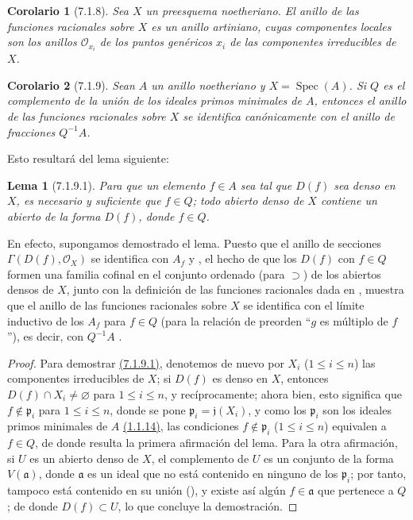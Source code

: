 \documentclass[oneside]{amsart}
\theoremstyle{ega-env-style}
\theoremstyle{ega-thm-env-style}
\newtheorem*{lemma}{Lema}
\newtheorem*{corollary}{Corolario}
\theoremstyle{ega-defn-env-style}
\def\leq{\leqslant}                 %
\let\EGAOriginalLabel\label
\renewcommand{\label}[1]{\phantomsection\EGAOriginalLabel{#1}}
\begin{document}
\begin{corollary}[7.1.8]
\label{I.7.1.8}
Sea $X$ un preesquema noetheriano.
El anillo de las funciones racionales sobre $X$ es un anillo artiniano, cuyas componentes locales son los anillos $\mathscr{O}_{x_i}$ de los puntos genéricos $x_i$ de las componentes irreducibles de $X$.
\end{corollary}

\begin{corollary}[7.1.9]
\label{I.7.1.9}
Sean $A$ un anillo noetheriano y $X=\operatorname{Spec}(A)$.
Si $Q$ es el complemento de la unión de los ideales primos minimales de $A$, entonces el anillo de las funciones racionales sobre $X$ se identifica canónicamente con el anillo de fracciones $Q^{-1}A$.
\end{corollary}

Esto resultará del lema siguiente:
\begin{lemma}[7.1.9.1]
\label{I.7.1.9.1}
Para que un elemento $f\in A$ sea tal que $D(f)$ sea denso en $X$, es necesario y suficiente que $f\in Q$; todo abierto denso de $X$ contiene un abierto de la forma $D(f)$, donde $f\in Q$.
\end{lemma}

En efecto, supongamos demostrado el lema. Puesto que el anillo de secciones $\Gamma(D(f),\mathscr{O}_X)$ se identifica con $A_f$  y , el hecho de que los $D(f)$ con $f\in Q$ formen una familia cofinal en el conjunto ordenado (para $\supset$) de los abiertos densos de $X$, junto con la definición de las funciones racionales dada en , muestra que el anillo de las funciones racionales sobre $X$ se identifica con el límite inductivo de los $A_f$ para $f\in Q$ (para la relación de preorden ``$g$ es múltiplo de $f$''), es decir, con $Q^{-1}A$ .

\begin{proof}
Para demostrar \hyperref[I.7.1.9.1]{(7.1.9.1)}, denotemos de nuevo por $X_i$ ($1\leq i\leq n$) las componentes irreducibles de $X$; si $D(f)$ es denso en $X$, entonces $D(f)\cap X_i\neq\varnothing$ para $1\leq i\leq n$, y recíprocamente; ahora bien, esto significa que $f\notin\mathfrak{p}_i$ para $1\leq i\leq n$, donde se pone $\mathfrak{p}_i=\mathfrak{j}(X_i)$, y como los $\mathfrak{p}_i$ son los ideales primos minimales de $A$ \hyperref[I.1.1.14]{(1.1.14)}, las condiciones $f\notin\mathfrak{p}_i$ ($1\leq i\leq n$) equivalen a $f\in Q$, de donde resulta la primera afirmación del lema.
Para la otra afirmación, si $U$ es un abierto denso de $X$, el complemento de $U$ es un conjunto de la forma $V(\mathfrak{a})$, donde $\mathfrak{a}$ es un ideal que no está contenido en ninguno de los $\mathfrak{p}_i$; por tanto, tampoco está contenido en su unión (\cite[p.~13]{I-10}), y existe así algún $f\in\mathfrak{a}$ que pertenece a $Q$; de donde $D(f)\subset U$, lo que concluye la demostración.
\end{proof}
\end{document}
